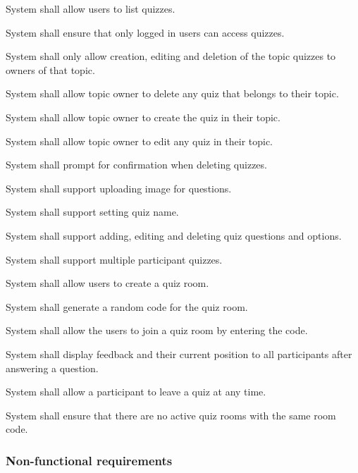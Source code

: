 \begin{frlist}
    \item System shall allow users to list quizzes.
    \item System shall ensure that only logged in users can access quizzes.
    \item System shall only allow creation, editing and deletion of the topic quizzes to owners of that topic.
    \item System shall allow topic owner to delete any quiz that belongs to their topic.
    \item System shall allow topic owner to create the quiz in their topic.
    \item System shall allow topic owner to edit any quiz in their topic.
    \item System shall prompt for confirmation when deleting quizzes.
    \item System shall support uploading image for questions.
    \item System shall support setting quiz name.
    \item System shall support adding, editing and deleting quiz questions and options.
    \item System shall support multiple participant quizzes.
    \item System shall allow users to create a quiz room.
    \item System shall generate a random code for the quiz room.
    \item System shall allow the users to join a quiz room by entering the code.
    \item System shall display feedback and their current position to all participants after answering a question.
    \item System shall allow a participant to leave a quiz at any time.
    \item System shall ensure that there are no active quiz rooms with the same room code.
\end{frlist}


\subsubsection{Non-functional requirements}


